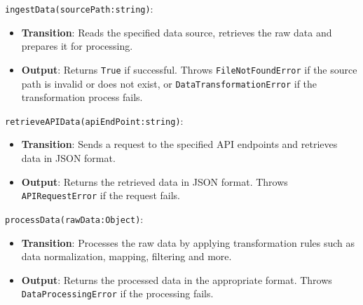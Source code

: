 \documentclass[12pt, titlepage]{article}
\begin{document}
\begin{description}
  \texttt{ingestData(sourcePath:string)}:
  \item
  \begin{itemize}
    \item \textbf{Transition}: Reads the specified data source, retrieves the raw data and prepares
    it for processing.
  \end{itemize}
  \item
  \begin{itemize}
    \item \textbf{Output}: Returns \texttt{True} if successful. Throws \texttt{FileNotFoundError}
    if the source path is invalid or does not exist, or \texttt{DataTransformationError} if the
    transformation process fails.
  \end{itemize}
  \item

  \texttt{retrieveAPIData(apiEndPoint:string)}:
  \item
  \begin{itemize}
    \item \textbf{Transition}: Sends a request to the specified API endpoints and retrieves data in JSON
    format.
  \end{itemize}
  \item 
  \begin{itemize}
    \item \textbf{Output}: Returns the retrieved data in JSON format. Throws \texttt{APIRequestError} if
    the request fails.
  \end{itemize}
  \item

  \texttt{processData(rawData:Object)}:
  \item
  \begin{itemize}
    \item \textbf{Transition}: Processes the raw data by applying transformation rules such as data
    normalization, mapping, filtering and more.
  \end{itemize}
  \item
  \begin{itemize}
    \item \textbf{Output}: Returns the processed data in the appropriate format. Throws \\
    \texttt{DataProcessingError} if the processing fails.
  \end{itemize}
  \item


\end{description}
\end{document}
